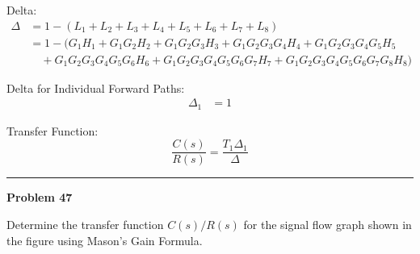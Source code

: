 \documentclass[11pt]{article}
\begin{document}
Delta:
{\small
\begin{align*}
\Delta &= 1 - (L_1 + L_2 + L_3 + L_4 + L_5 + L_6 + L_7 + L_8) \\
       &= 1 - (G_1 H_1 + G_1 G_2 H_2 + G_1 G_2 G_3 H_3 + G_1 G_2 G_3 G_4 H_4 + G_1 G_2 G_3 G_4 G_5 H_5 \\
       &\quad + G_1 G_2 G_3 G_4 G_5 G_6 H_6 + G_1 G_2 G_3 G_4 G_5 G_6 G_7 H_7 + G_1 G_2 G_3 G_4 G_5 G_6 G_7 G_8 H_8)
\end{align*}
}

\vspace{0.5em}

Delta for Individual Forward Paths:
\begin{align*}
\Delta_1 &= 1
\end{align*}

\vspace{0.5em}

Transfer Function:
\[
\frac{C(s)}{R(s)} = \frac{T_1 \Delta_1}{\Delta}
\]

\noindent{}

\newpage
  \setcounter{page}{72}  
\noindent\rule{\textwidth}{1pt}
\noindent\textbf{Problem 47} \hfill

\noindent Determine the transfer function $C(s)/R(s)$ for the signal flow graph shown in the figure using Mason's Gain Formula.

\end{document}
